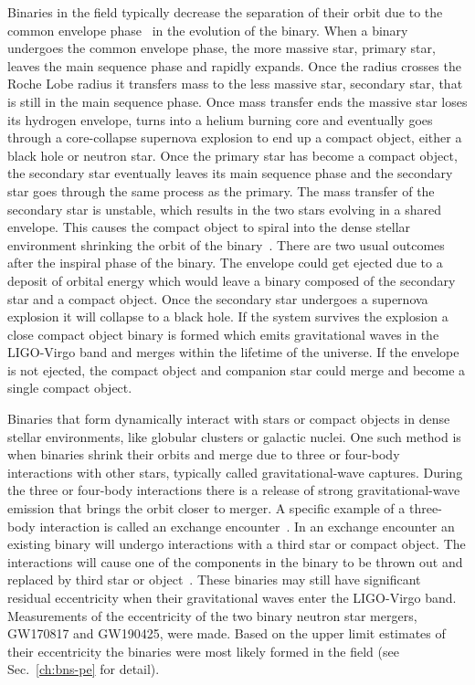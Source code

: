 Binaries in the field typically decrease the separation of their orbit due to the common envelope phase~\cite{Postnov:2006hka} in the evolution of the binary. When a binary undergoes the common envelope phase, the more massive star, primary star, leaves the main sequence phase and rapidly expands. Once the radius crosses the Roche Lobe radius it transfers mass to the less massive star, secondary star, that is still in the main sequence phase. Once mass transfer ends the massive star loses its hydrogen envelope, turns into a helium burning core and eventually goes through a core-collapse supernova explosion to end up a compact object, either a black hole or neutron star. Once the primary star has become a compact object, the secondary star eventually leaves its main sequence phase and the secondary star goes through the same process as the primary. The mass transfer of the secondary star is unstable, which results in the two stars evolving in a shared envelope. This causes the compact object to spiral into the dense stellar environment shrinking the orbit of the binary~\cite{Postnov:2006hka,Ivanova:2012vx}. There are two usual outcomes after the inspiral phase of the binary. The envelope could get ejected due to a deposit of orbital energy which would leave a binary composed of the secondary star and a compact object. Once the secondary star undergoes a supernova explosion it will collapse to a black hole. If the system survives the explosion a close compact object binary is formed which emits gravitational waves in the LIGO-Virgo band and merges within the lifetime of the universe. If the envelope is not ejected, the compact object and companion star could merge and become a single compact object. 

Binaries that form dynamically interact with stars or compact objects in dense stellar environments, like globular clusters or galactic nuclei. One such method is when binaries shrink their orbits and merge due to three or four-body interactions with other stars, typically called gravitational-wave captures. During the three or four-body interactions there is a release of strong gravitational-wave emission that brings the orbit closer to merger. A specific example of a three-body interaction is called an exchange encounter~\cite{Ivanova:2006xp, Ivanova:2007bu}. In an exchange encounter an existing binary will undergo interactions with a third star or compact object. The interactions will cause one of the components in the binary to be thrown out and replaced by third star or object~\cite{Heggie:1996dr}. These binaries may still have significant residual eccentricity when their gravitational waves enter the LIGO-Virgo band. Measurements of the eccentricity of the two binary neutron star mergers, GW170817 and GW190425, were made. Based on the upper limit estimates of their eccentricity the binaries were most likely formed in the field (see Sec.~\ref{ch:bns-pe} for detail).

